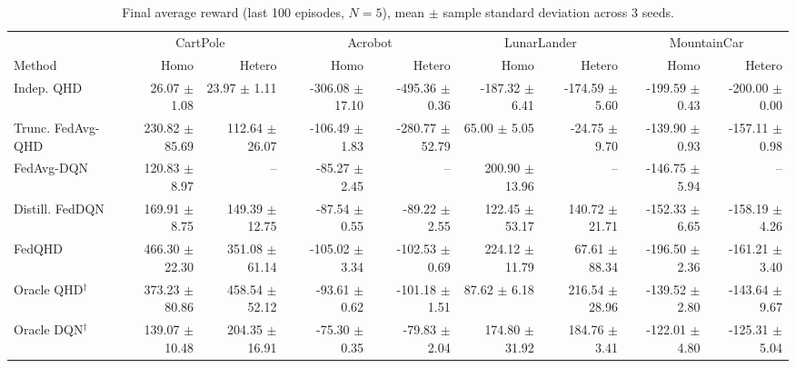 \begin{table}[ht]
\centering
\setlength{\tabcolsep}{2pt}
\small
\caption{Final average reward (last 100 episodes, $N{=}5$), mean $\pm$ sample standard deviation across 3 seeds.}
\label{tab:main_results_3seed_variance}
\begin{tabular}{l rr rr rr rr}
\toprule
 & \multicolumn{2}{c}{CartPole} & \multicolumn{2}{c}{Acrobot} & \multicolumn{2}{c}{LunarLander} & \multicolumn{2}{c}{MountainCar} \\
\cmidrule(lr){2-3}\cmidrule(lr){4-5}\cmidrule(lr){6-7}\cmidrule(lr){8-9}
Method & Homo & Hetero & Homo & Hetero & Homo & Hetero & Homo & Hetero \\
\midrule
Indep. QHD & 26.07 $\pm$ 1.08 & 23.97 $\pm$ 1.11 & -306.08 $\pm$ 17.10 & -495.36 $\pm$ 0.36 & -187.32 $\pm$ 6.41 & -174.59 $\pm$ 5.60 & -199.59 $\pm$ 0.43 & -200.00 $\pm$ 0.00 \\
Trunc. FedAvg-QHD & 230.82 $\pm$ 85.69 & 112.64 $\pm$ 26.07 & -106.49 $\pm$ 1.83 & -280.77 $\pm$ 52.79 & 65.00 $\pm$ 5.05 & -24.75 $\pm$ 9.70 & -139.90 $\pm$ 0.93 & -157.11 $\pm$ 0.98 \\
FedAvg-DQN & 120.83 $\pm$ 8.97 & {--} & -85.27 $\pm$ 2.45 & {--} & 200.90 $\pm$ 13.96 & {--} & -146.75 $\pm$ 5.94 & {--} \\
Distill. FedDQN & 169.91 $\pm$ 8.75 & 149.39 $\pm$ 12.75 & -87.54 $\pm$ 0.55 & -89.22 $\pm$ 2.55 & 122.45 $\pm$ 53.17 & 140.72 $\pm$ 21.71 & -152.33 $\pm$ 6.65 & -158.19 $\pm$ 4.26 \\
FedQHD & 466.30 $\pm$ 22.30 & 351.08 $\pm$ 61.14 & -105.02 $\pm$ 3.34 & -102.53 $\pm$ 0.69 & 224.12 $\pm$ 11.79 & 67.61 $\pm$ 88.34 & -196.50 $\pm$ 2.36 & -161.21 $\pm$ 3.40 \\
\midrule
Oracle QHD$^\dagger$ & 373.23 $\pm$ 80.86 & 458.54 $\pm$ 52.12 & -93.61 $\pm$ 0.62 & -101.18 $\pm$ 1.51 & 87.62 $\pm$ 6.18 & 216.54 $\pm$ 28.96 & -139.52 $\pm$ 2.80 & -143.64 $\pm$ 9.67 \\
Oracle DQN$^\dagger$ & 139.07 $\pm$ 10.48 & 204.35 $\pm$ 16.91 & -75.30 $\pm$ 0.35 & -79.83 $\pm$ 2.04 & 174.80 $\pm$ 31.92 & 184.76 $\pm$ 3.41 & -122.01 $\pm$ 4.80 & -125.31 $\pm$ 5.04 \\
\bottomrule
\end{tabular}
\end{table}
